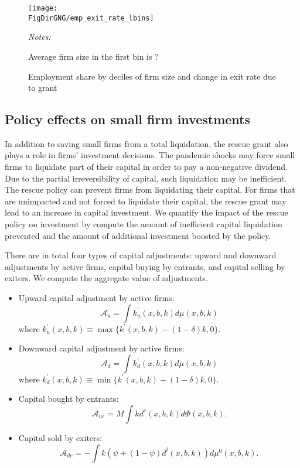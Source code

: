 \documentclass[11pt,english]{article}
\newcommand*{\FigDirGNG}{../figures/grant_vs_nogrant} %
\begin{document}
    \begin{figure}[htbp]
    	\centering
    		\centering
    		\texttt{[image: \\FigDirGNG/emp\_exit\_rate\_lbins]}
    		\caption{Employment share by deciles of firm size and change in exit rate due to  grant}

\vspace{1ex}
	{\textit{Notes:} \raggedright Average firm size in the first bin is ? \par} 
 
    \end{figure}

\FloatBarrier
	
\subsection{Policy effects on small firm investments}
In addition to saving small firms from a total liquidation, the rescue grant
also plays a role in firms' investment decisions. The pandemic shocks may
force small firms to liquidate part of their capital in order to pay a
non-negative dividend. Due to the partial irreversibility of capital, such
liquidation may be inefficient. The rescue policy can prevent firms from
liquidating their capital. For firms that are unimpacted and not forced to
liquidate their capital, the rescue grant may lead to an increase in capital
investment. We quantify the impact of the rescue policy on investment by
compute the amount of inefficient capital liquidation prevented and the
amount of additional investment boosted by the policy.

There are in total four types of capital adjustments: upward and downward
adjustments by active firms, capital buying by entrants, and capital selling
by exiters. We compute the aggregate value of adjustments. 

\begin{itemize}
\item Upward capital adjustment by active firms: 
\begin{equation*}
\mathcal{A}_u = \int k^{\prime }_u(x,b,k) d\mu(x,b,k)
\end{equation*}
where $k^{\prime }_u(x,b,k) \equiv \max \{k^{\prime }(x,b,k)-(1-\delta)k,0 \}
$.

\item Downward capital adjustment by active firms: 
\begin{equation*}
\mathcal{A}_d = \int k^{\prime }_d(x,b,k) d\mu(x,b,k)
\end{equation*}
where $k^{\prime }_d(x,b,k) \equiv \min \{k^{\prime }(x,b,k)-(1-\delta)k,0 \}
$.

\item Capital bought by entrants: 
\begin{equation*}
\mathcal{A}_{ue} = M \int k d^e(x,b,k) d\Phi(x,b,k).
\end{equation*}

\item Capital sold by exiters: 
\begin{equation*}
\mathcal{A}_{de} = -\int k (\psi + (1-\psi)d^l(x,b,k)) d\mu^0(x,b,k).
\end{equation*}
\end{itemize}
\end{document}
